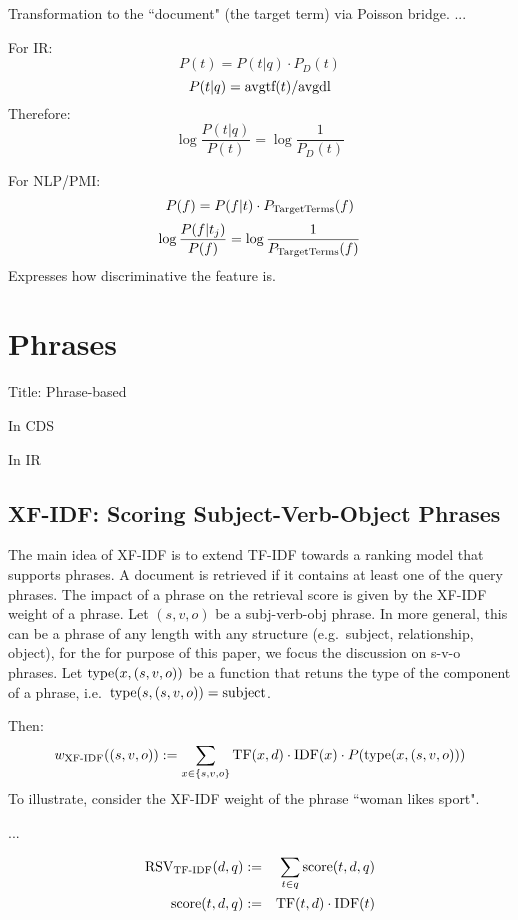 Transformation to the ``document" (the target term) via Poisson bridge.
...

For IR:
\[
P(t) = P(t|q) \cdot P_D(t)
\]
\[
P(t|q) = \textmd{avgtf}(t) / \textmd{avgdl}
\]
Therefore:
\[
\log\frac{P(t|q)}{P(t)} = \log\frac{1}{P_D(t)}
\]

For NLP/PMI:
\[
P(f) = P(f|t) \cdot P_\textmd{TargetTerms}(f)
\]
\[
\log\frac{P(f|t_j)}{P(f)} = \log\frac{1}{P_\textmd{TargetTerms}(f)}
\]
Expresses how discriminative the feature is.




\section{Phrases}

Title: Phrase-based


In CDS


In IR


\subsection{XF-IDF: Scoring Subject-Verb-Object Phrases}

The main idea of XF-IDF \cite{Azzam/etal:SIGMOD:KEYS:2010} is to extend
TF-IDF towards a ranking model that supports phrases.
%
A document is retrieved if it contains at least one of the query phrases.
%
The impact of a phrase on the retrieval score is given by the XF-IDF
weight of a phrase.
%
Let $(s,v,o)$ be a subj-verb-obj phrase.
In more general, this can be a phrase of any length with any structure
(e.g.~subject, relationship, object), for the for purpose of this paper,
we focus the discussion on s-v-o phrases.
%
Let $\textmd{type}(x,(s,v,o))$ be a function that retuns the type of the component
of a phrase, i.e.~$\textmd{type}(s,(s,v,o))=\textmd{subject}$.

Then:
\[
w_\textmd{XF-IDF}((s,v,o)) :=
\sum_{x \in \{s,v,o\}} \textmd{TF}(x,d) \cdot \textmd{IDF}(x) \cdot P(\textmd{type}(x,(s,v,o)))
\]
To illustrate, consider the XF-IDF weight of the phrase ``woman likes sport".

...

\begin{eqnarray}
\label{tf-idf-phrase}
\textmd{RSV}_\textmd{TF-IDF}(d,q) &:=& \sum_{t \in q} \textmd{score}(t,d,q)\\
\textmd{score}(t,d,q) &:=&
\textmd{TF}(t,d) \cdot \textmd{IDF}(t)
\end{eqnarray}





